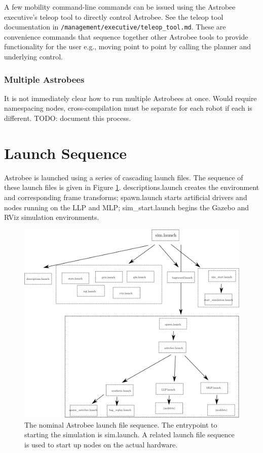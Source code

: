 \documentclass{article}
\begin{document}
A few mobility command-line commands can be issued using the Astrobee executive's teleop tool to directly control Astrobee. See the teleop tool documentation in \texttt{/management/executive/teleop\_tool.md}. These are convenience commands that sequence together other Astrobee tools to provide functionality for the user e.g., moving point to point by calling the planner and underlying control.

\subsubsection{Multiple Astrobees}

It is not immediately clear how to run multiple Astrobees at once. Would require namespacing nodes, cross-compilation must be separate for each robot if each is different.
TODO: document this process.

\section{Launch Sequence}

Astrobee is launched using a series of cascading launch files. The sequence of these launch files is given in Figure \ref{fig:launchfiles}. descriptions.launch creates the environment and corresponding frame transforms; spawn.launch starts artificial drivers and nodes running on the LLP and MLP; sim\_start.launch begins the Gazebo and RViz simulation environments. 

\begin{figure}[h!]
    \begin{adjustwidth}{-1in}{-1in}
    \centering
    \includegraphics[width=1.4\textwidth]{img/astrobee2.png}
    \caption{The nominal Astrobee launch file sequence. The entrypoint to starting the simulation is sim.launch. A related launch file sequence is used to start up nodes on the actual hardware.}
    \label{fig:launchfiles}
    \end{adjustwidth}
\end{figure}
\end{document}
